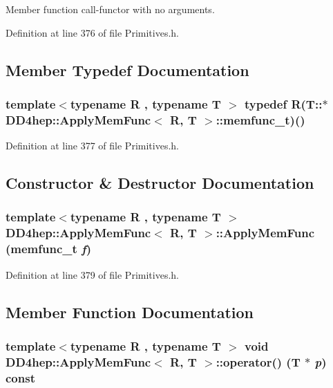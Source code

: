 Member function call-\/functor with no arguments. 

Definition at line 376 of file Primitives.h.

\subsection{Member Typedef Documentation}
\hypertarget{struct_d_d4hep_1_1_apply_mem_func_a6389bc0d8232dcc89a3c8162471bb439}{
\subsubsection[{memfunc\_\-t}]{\setlength{\rightskip}{0pt plus 5cm}template$<$typename R , typename T $>$ typedef R(T::$\ast$ {\bf DD4hep::ApplyMemFunc}$<$ R, {\bf T} $>$::{\bf memfunc\_\-t})()}}
\label{struct_d_d4hep_1_1_apply_mem_func_a6389bc0d8232dcc89a3c8162471bb439}


Definition at line 377 of file Primitives.h.

\subsection{Constructor \& Destructor Documentation}
\hypertarget{struct_d_d4hep_1_1_apply_mem_func_a6bf11f21888593fa22e7c4a354b9f965}{
\subsubsection[{ApplyMemFunc}]{\setlength{\rightskip}{0pt plus 5cm}template$<$typename R , typename T $>$ {\bf DD4hep::ApplyMemFunc}$<$ R, {\bf T} $>$::{\bf ApplyMemFunc} ({\bf memfunc\_\-t} {\em f})}}
\label{struct_d_d4hep_1_1_apply_mem_func_a6bf11f21888593fa22e7c4a354b9f965}


Definition at line 379 of file Primitives.h.

\subsection{Member Function Documentation}
\hypertarget{struct_d_d4hep_1_1_apply_mem_func_a1939b3550b041b84c2a1b6880362b6be}{
\subsubsection[{operator()}]{\setlength{\rightskip}{0pt plus 5cm}template$<$typename R , typename T $>$ void {\bf DD4hep::ApplyMemFunc}$<$ R, {\bf T} $>$::operator() ({\bf T} $\ast$ {\em p}) const}}
\label{struct_d_d4hep_1_1_apply_mem_func_a1939b3550b041b84c2a1b6880362b6be}


